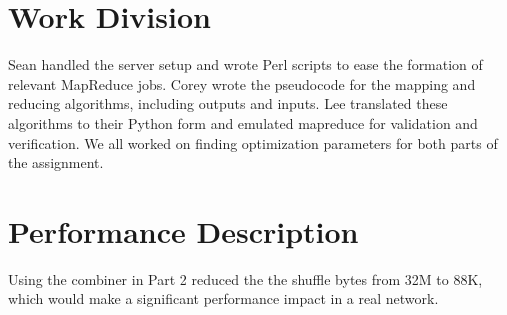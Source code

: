 \documentclass[14pt]{extarticle}
\begin{document}
\section{Work Division}
Sean handled the server setup and wrote Perl scripts to ease the formation of relevant MapReduce jobs.
Corey wrote the pseudocode for the mapping and reducing algorithms, including outputs and inputs.
Lee translated these algorithms to their Python form and emulated mapreduce for validation and verification. 
We all worked on finding optimization parameters for both parts of the assignment. 

\section{Performance Description}
Using the combiner in Part 2 reduced the the shuffle bytes from 32M to 88K, which
would make a significant performance impact in a real network.
\end{document}
